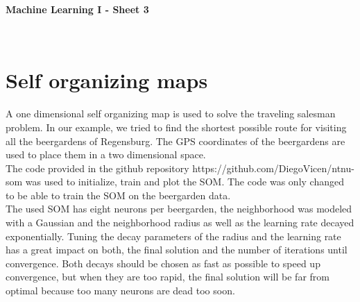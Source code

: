 \documentclass[DIV=12, ngerman, fontsize=12pt, parskip=half]{scrreprt}
\begin{document}
	
	\setcounter{chapter}{1-1}
	
	\begin{center}
		
		\huge
		\textbf{Machine Learning I - Sheet 3} 
	\end{center}
	
	
	\begin{center}
		\Large
	\end{center}
	
	
	\begin{center}
		\large
		\\
		
	\end{center}
	
	\thispagestyle{empty}
	\thispagestyle{empty}
	
	\vspace{0cm}
	
	{\let\clearpage\relax \chapter{Self organizing maps}}
	A one dimensional self organizing map is used to solve the traveling salesman problem. In our example, we tried to find the shortest possible route for visiting all the beergardens of Regensburg. The GPS coordinates of the beergardens are used to place them in a two dimensional space. \\
	The code provided in the github repository https://github.com/DiegoVicen/ntnu-som was used to initialize, train and plot the SOM. The code was only changed to be able to train the SOM on the beergarden data. \\
	The used SOM has eight neurons per beergarden, the neighborhood was modeled with a Gaussian and the neighborhood radius as well as the learning rate decayed exponentially. Tuning the decay parameters of the radius and the learning rate has a great impact on both, the final solution and the number of iterations until convergence. Both decays should be chosen as fast as possible to speed up convergence, but when they are too rapid, the final solution will be far from optimal because too many neurons are dead too soon.
	
\end{document}
